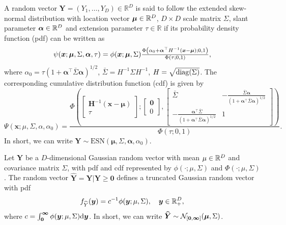 \documentclass[12pt]{article}
\begin{document}
\begin{definition}

A random vector $\bm Y=(Y_1,\dots, Y_D) \in \mathbb{R}^D$ is said to follow the extended skew-normal distribution with location vector $\bm\mu \in {\mathbb R}^D$, $D \times D$ scale matrix $\Sigma$, slant parameter $\bm \alpha \in {\mathbb R}^D$ and extension parameter $\tau \in \mathbb{R}$ if its probability density function (pdf) can be written as
%
$$
\psi({\boldsymbol{x}};\bm \mu,\Sigma,\bm \alpha,\tau) = 
\phi({\boldsymbol{x}};\bm \mu,\Sigma) 
{\textstyle{\Phi\left(\alpha_0 + \bm\alpha^\top H^{-1}\left({\boldsymbol{x}}-\bm\mu\right); 0, 1\right)\over\Phi\left(\tau; 0, 1\right)}},
$$
%
where $\alpha_0 = \tau \left(1+\bm\alpha^\top\bar\Sigma\bm\alpha \right)^{1/2}$, $\bar\Sigma = H^{-1}\Sigma H^{-1}$, $H = \sqrt{{\rm diag}(\Sigma)}$.
%
The corresponding cumulative distribution function (cdf) is given by
%
\begin{equation*}
    \Psi(\bm x;\mu,\Sigma,\alpha,\alpha_0) =
    \frac{\Phi \left(
    \begin{bmatrix} 
        \bm  H^{-1}( \bm x- \bm \mu)  \\
        \tau
    \end{bmatrix};
    \begin{bmatrix} 
    \bm 0 \\ 0
    \end{bmatrix},
    \begin{bmatrix}
        \bar\Sigma & -\frac{\bar{\Sigma}\bm\alpha}{(1+\bm\alpha^\top\bar{\Sigma}\bm\alpha)^{1/2}} \\
       -\frac{\bm\alpha^\top\bar{\Sigma}}{\left(1+\bm\alpha^\top\bar{\Sigma}\bm\alpha\right)^{1/2}} &	1
    \end{bmatrix} \right)
    }
    {\Phi\left(\tau; 0, 1\right)}.
\end{equation*}
%
In short, we can write $\bm Y \sim \text{ESN}(\bm\mu,\Sigma,\bm\alpha,\alpha_0)$.
\end{definition}

\begin{definition}
\label{def:mvnorm_trunc}

Let $\bm Y$ be a $D$-dimensional Gaussian random vector with mean $\mu \in {\mathbb R}^D$ and covariance matrix $\Sigma$, with pdf and cdf represented by $\phi(\cdot;\mu,\Sigma)$ and $\Phi(\cdot;\mu,\Sigma)$. The random vector $\hat{\bm Y} = \bm Y| \bm Y\geq \bm 0$ defines a truncated Gaussian random vector with pdf
%
$$
f_{{\widehat{Y}}}({\boldsymbol{y}}) = c^{-1} \phi({\boldsymbol{y}};\mu,\Sigma), \quad {\boldsymbol{y}} \in {\mathbb R}^D_+,
$$
%
where $c=\int_{\bm 0}^{\bm \infty} \phi({\boldsymbol{y}};\mu,\Sigma)\text d {\boldsymbol{y}}$. In short, we can write ${\widehat{\bm Y}} \sim {\mathcal N}_{\left[ \bm 0 , \bm \infty \right]}(\bm \mu, \Sigma)$. 
\end{definition}
\end{document}
